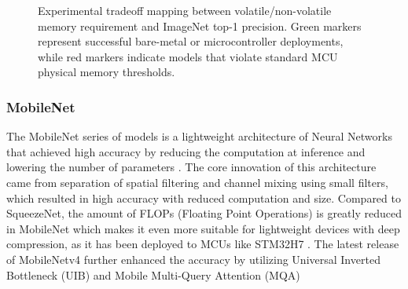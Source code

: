\documentclass[conference]{IEEEtran}
\begin{document}
	\begin{figure}[t]
		\centering
		\caption{Experimental tradeoff mapping between volatile/non-volatile memory requirement and ImageNet top-1 precision. Green markers represent successful bare-metal or microcontroller deployments, while red markers indicate models that violate standard MCU physical memory thresholds.}
		\label{fig:memory_accuracy_tradeoff}
	\end{figure}
	
	
	\subsubsection{MobileNet}
	The MobileNet series of models is a lightweight architecture of Neural Networks that achieved high accuracy by reducing the computation at inference and lowering the number of parameters \cite{mobilenet2017}. The core innovation of this architecture came from separation of spatial filtering and channel mixing using small filters, which resulted in high accuracy with reduced computation and size. Compared to SqueezeNet, the amount of FLOPs (Floating Point Operations) is greatly reduced in MobileNet which makes it even more suitable for lightweight devices with deep compression, as it has been deployed to MCUs like STM32H7 \cite{rusci2019}. The latest release of MobileNetv4 further enhanced the accuracy by utilizing Universal Inverted Bottleneck (UIB) and Mobile Multi-Query Attention (MQA) \cite{mobilenet2024}
	
\end{document}
